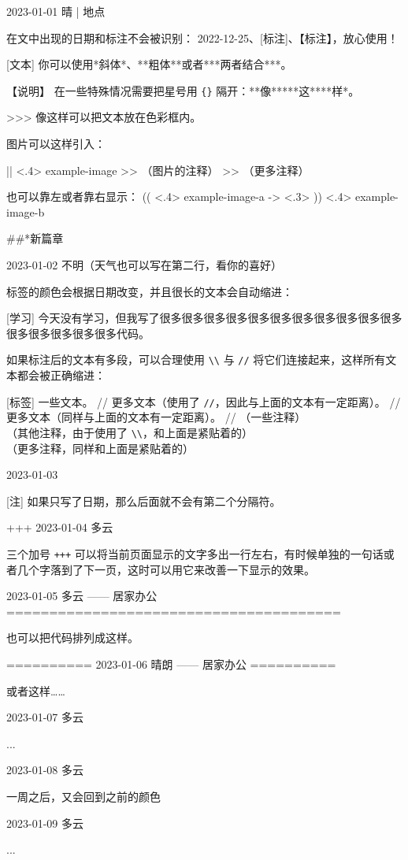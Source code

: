 \documentclass[11pt, paperstyle=light yellow, color entry,
  title in boldface, title in sffamily, use style = classical]{jwjournal}
\begin{document}
2023-01-01 晴 | 地点

  在文中出现的日期和标注不会被识别： 2022-12-25、[标注]、【标注】，放心使用！

  [文本] 你可以使用*斜体*、**粗体**或者***两者结合***。

  【说明】 %
  在一些特殊情况需要把星号用 \texttt{\{\}} 隔开：**像**{}***这***{}*样*。

  >>> 像这样可以把文本放在色彩框内。

  图片可以这样引入：

  || <.4> {example-image} %
  >> （图片的注释）
  >> （更多注释）

  也可以靠左或者靠右显示：
  (( <.4> {example-image-a} %
  -> <.3> %
  )) <.4> {example-image-b} %


##*{新篇章}

2023-01-02
不明（天气也可以写在第二行，看你的喜好）

  标签的颜色会根据日期改变，并且很长的文本会自动缩进：

  [学习] 今天没有学习，但我写了很多很多很多很多很多很多很多很多很多很多很多很多很多很多很多很多代码。

  如果标注后的文本有多段，可以合理使用 \texttt{\textbackslash\textbackslash} 与 \texttt{\slash\slash} 将它们连接起来，这样所有文本都会被正确缩进：

  [标签] 一些文本。
    //
    更多文本（使用了 \texttt{\slash\slash}，因此与上面的文本有一定距离）。
    //
    更多文本（同样与上面的文本有一定距离）。
    //
    （一些注释）
    \\
    （其他注释，由于使用了 \texttt{\textbackslash\textbackslash}，和上面是紧贴着的）
    \\
    （更多注释，同样和上面是紧贴着的）



2023-01-03

  [注] 如果只写了日期，那么后面就不会有第二个分隔符。


+++
2023-01-04  多云

  三个加号 \texttt{+++} 可以将当前页面显示的文字多出一行左右，有时候单独的一句话或者几个字落到了下一页，这时可以用它来改善一下显示的效果。



2023-01-05    多云        —— 居家办公
=======================================

也可以把代码排列成这样。


==========
2023-01-06    晴朗        —— 居家办公
==========

或者这样……



2023-01-07  多云

  ...



2023-01-08  多云

  一周之后，又会回到之前的颜色



2023-01-09  多云

  ...
\end{document}

